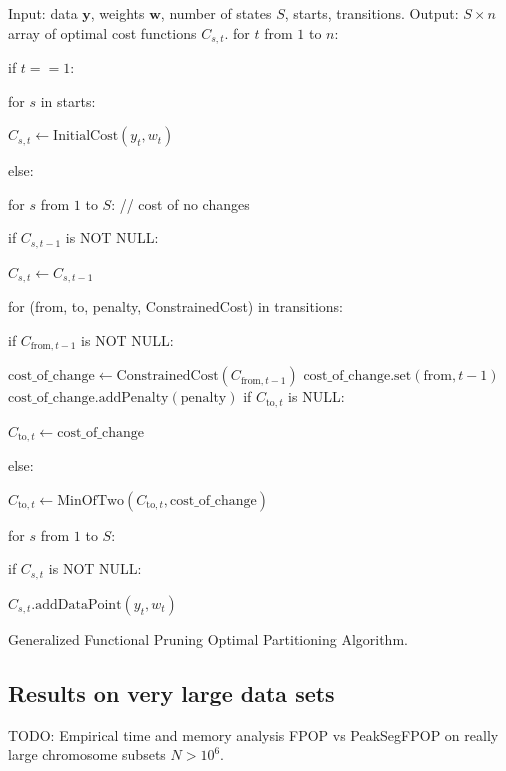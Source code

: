 \documentclass{article}
\begin{document}
\begin{algorithm}[H]
\begin{algorithmic}[1]
\STATE Input: data $\mathbf y$, weights $\mathbf w$, 
number of states $S$, starts, transitions.
\STATE Output: $S\times n$ array of optimal cost functions $C_{s,t}$.
\STATE for $t$ from $1$ to $n$:
\begin{ALC@g}
  \STATE if $t==1$:
  \begin{ALC@g}
    \STATE for $s$ in starts: 
    \begin{ALC@g}
      \STATE $C_{s,t}\gets\text{InitialCost}(y_t, w_t)$
    \end{ALC@g}
  \end{ALC@g}
  \STATE else:
  \begin{ALC@g}
    \STATE for $s$ from $1$ to $S$: // cost of no changes
    \begin{ALC@g}
      \STATE if $C_{s,t-1}$ is NOT NULL:
      \begin{ALC@g}
        \STATE $C_{s,t}\gets C_{s,t-1}$
      \end{ALC@g}
    \end{ALC@g}
    \STATE for (from, to, penalty, ConstrainedCost) in transitions:
    \begin{ALC@g}
      \STATE if $C_{\text{from},t-1}$ is NOT NULL:
      \begin{ALC@g}
        \STATE
        $\text{cost\_of\_change}\gets
        \text{ConstrainedCost}(C_{\text{from}, t-1})$
        \STATE
        $\text{cost\_of\_change.set}
        (\text{from}, t-1)$
        \STATE
        $\text{cost\_of\_change.addPenalty}
        (\text{penalty})$
        \STATE if $C_{\text{to},t}$ is NULL:
        \begin{ALC@g}
          \STATE $C_{\text{to},t}\gets\text{cost\_of\_change}$
        \end{ALC@g}
        \STATE else:
        \begin{ALC@g}
          \STATE
          $C_{\text{to},t}\gets \text{MinOfTwo}(C_{\text{to},t},
          \text{cost\_of\_change})$
        \end{ALC@g}
      \end{ALC@g}
    \end{ALC@g}
    \STATE for $s$ from $1$ to $S$:
    \begin{ALC@g}
      \STATE if $C_{s,t}$ is NOT NULL:
      \begin{ALC@g}
        \STATE $C_{s,t}\text{.addDataPoint}(y_t, w_t)$
      \end{ALC@g}
    \end{ALC@g}
  \end{ALC@g}
\end{ALC@g}
\caption{\label{algo:GFPOP}Generalized Functional Pruning Optimal
  Partitioning Algorithm.}
\end{algorithmic}
\end{algorithm}

\subsection{Results on very large data sets}

TODO: Empirical time and memory analysis FPOP vs PeakSegFPOP on really
large chromosome subsets $N>10^6$.
\end{document}
